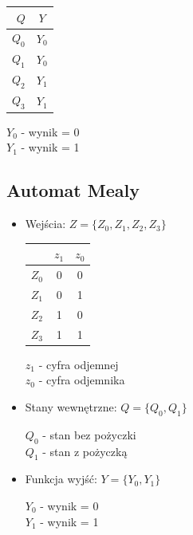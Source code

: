 \documentclass[12pt,a4paper]{article}
\begin{document}
\begin{itemize}
					\begin{minipage}{{.5\textwidth}}
						\centering
						\begin{tabular}{r|c}
							\(Q\)	&	\(Y\)	\\\hline
							\(Q_0\)	&	\(Y_0\)	\\
							\(Q_1\)	&	\(Y_0\)	\\
							\(Q_2\)	&	\(Y_1\)	\\
							\(Q_3\)	&	\(Y_1\)	\\
						\end{tabular}
					\end{minipage}%
					\begin{minipage}{{.5\textwidth}}	
						\(Y_0\) - wynik = 0\\
						\(Y_1\) - wynik = 1
					\end{minipage}
			\end{itemize}
		
		\subsection{Automat Mealy}
			\begin{itemize}
				\item Wejścia: \(Z = \{Z_0, Z_1, Z_2, Z_3\}\)\\
				
				\begin{minipage}{{.5\textwidth}}
					\centering
					\begin{tabular}{r|cc}
						&	\(z_1\)	&	\(z_0\)\\\hline
						\(Z_0\)	&	0	&	0	\\
						\(Z_1\)	&	0	&	1	\\
						\(Z_2\)	&	1	&	0	\\
						\(Z_3\)	&	1	&	1	\\
					\end{tabular}
				\end{minipage}%
				\begin{minipage}{{.5\textwidth}}	
					
					\(z_1\) - cyfra odjemnej\\
					\(z_0\) - cyfra odjemnika
				\end{minipage}
				
				\item Stany wewnętrzne: \(Q =\{Q_0, Q_1\}\)
					
					\(Q_0\) - stan bez pożyczki\\
					\(Q_1\) - stan z pożyczką
					
				\item Funkcja wyjść: \(Y=\{Y_0, Y_1\}\)
					
					\(Y_0\) - wynik = 0\\
					\(Y_1\) - wynik = 1
			\end{itemize}
		
\end{document}
